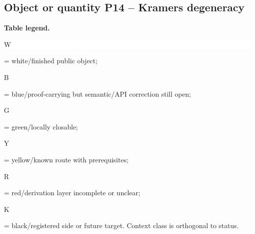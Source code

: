 \subsection*{Object or quantity P14 -- Kramers degeneracy}
\hypertarget{objproof:P14}{}
\par\smallskip\noindent\begin{minipage}{0.99\linewidth}\footnotesize\raggedright\textbf{Table legend.} \colorbox{white}{\strut W} = white/finished public object; \colorbox{cyan!20}{\strut B} = blue/proof-carrying but semantic/API correction still open; \colorbox{green!18}{\strut G} = green/locally closable; \colorbox{yellow!25}{\strut Y} = yellow/known route with prerequisites; \colorbox{red!20}{\strut R} = red/derivation layer incomplete or unclear; \colorbox{black!18}{\strut K} = black/registered side or future target. Context class is orthogonal to status.\end{minipage}\par\vspace{0.25em}
